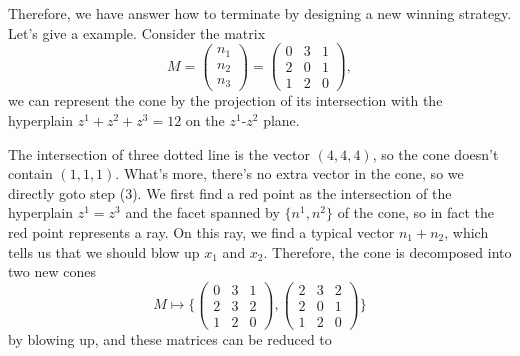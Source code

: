 \documentclass[12pt]{article}
\theoremstyle{definition}
\theoremstyle{plain}
\begin{document}
Therefore, we have answer how to terminate by designing a new winning strategy. 
Let's give a example. Consider the matrix 
\[
M=\left(
\begin{array}{ccc}
 n_1 \\
 n_2 \\
 n_3
\end{array}
\right)
=\left(
\begin{array}{ccc}
 0 & 3 & 1 \\
 2 & 0 & 1 \\
 1 & 2 & 0
\end{array}
\right),
\]
we can represent the cone by the projection of its intersection with the hyperplain $z^1+z^2+z^3=12$
on the $z^1$-$z^2$ plane.
\begin{center}
\end{center}
The intersection of three dotted line is the vector $(4,4,4)$, so the cone doesn't contain
$(1,1,1)$. What's more, there's no extra vector in the cone, so we directly goto step (3).
We first find a red point as the intersection of the hyperplain $z^1=z^3$ and the facet 
spanned by $\{n^1,n^2\}$ of the cone, so in fact the red point represents a ray.
On this ray, we find a typical vector $n_1+n_2$, which tells us that we should blow up 
$x_1$ and $x_2$.
Therefore, the cone is decomposed into two new cones 
\[
	M\mapsto \biggl\{
	\begin{pmatrix}
		0&3&1\\
		2&3&2\\
		1&2&0
	\end{pmatrix},
	\begin{pmatrix}
		2&3&2\\
		2&0&1\\
		1&2&0
	\end{pmatrix}
\biggr\}
\] 
by blowing up, and these matrices can be reduced to
\end{document}
